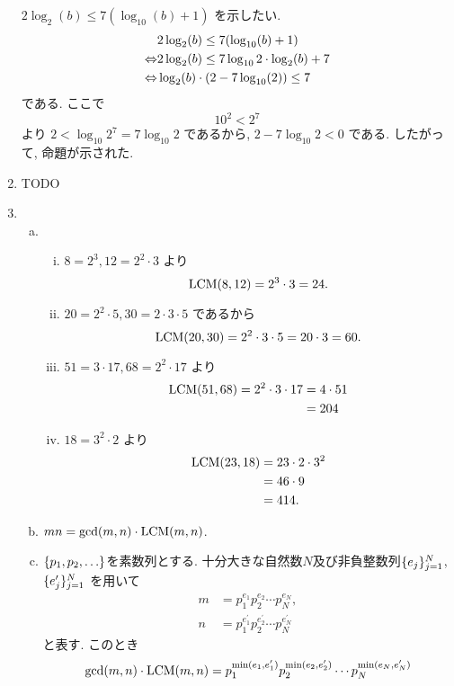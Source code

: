\begin{enumerate}[5.1]
$2 \log_2(b) \le 7(\log_{10}(b) + 1)$ を示したい.
\begin{align*}
  & 2\log_{2}(b) \le 7(\log_{10}(b) + 1) \\
  \Leftrightarrow & 2\log_2(b) \le 7\log_{10}2 \cdot \log_2(b) + 7 \\
  \Leftrightarrow & \log_2(b) \cdot (2 - 7\log_{10}(2)) \le 7
\end{align*}
である.
ここで
\[
  10^2 < 2^7
\]
より $2 < \log_{10}2^7 = 7\log_{10} 2$ であるから, $2 - 7\log_{10} 2 < 0$ である.
したがって, 命題が示された.
\item TODO
\item
\begin{enumerate}[(a)] %
\item
\begin{enumerate}[(i)] %
\item $8 = 2^3, 12 = 2^2 \cdot 3$ より
  \[
    \LCM(8, 12) = 2^3 \cdot 3 = 24.
  \]
\item $20 = 2^2 \cdot 5, 30 = 2 \cdot 3 \cdot 5$ であるから
  \[
    \LCM(20, 30) = 2^2 \cdot 3 \cdot 5 = 20 \cdot 3 = 60.
  \]
\item $51 = 3 \cdot 17, 68 = 2^2 \cdot 17$ より
  \begin{align*}
    \LCM(51, 68)
      = 2^2 \cdot 3 \cdot 17 &= 4 \cdot 51 \\
                             &= 204
  \end{align*}
\item $18 = 3^2 \cdot 2$ より
  \begin{align*}
    \LCM(23, 18)
      &= 23 \cdot 2 \cdot 3^2 \\
      &= 46 \cdot 9 \\
      &= 414.
  \end{align*}
\end{enumerate} %
\item %
$mn = \gcd(m, n) \cdot \LCM(m, n)$.
\item %
$\{ p_1, p_2, \ldots \}$を素数列とする.
十分大きな自然数$N$及び非負整数列$\{ e_j \}_{j=1}^N$, $\{ e_j^\prime \}_{j=1}^N$
を用いて
\begin{align*}
  m &= p_1^{e_1} p_2^{e_2} \cdots p_N^{e_N}, \\
  n &= p_1^{e_1^\prime} p_2^{e_2^\prime} \cdots p_N^{e_N^{\prime}}
\end{align*}
と表す.
このとき
\begin{align*}
  \gcd(m, n) \cdot \LCM(m, n)
    &= p_1^{\min(e_1, e_1^\prime)} p_2^{\min(e_2, e_2^\prime)} \cdots p_N^{\min(e_N, e_N^\prime)} \\

\end{align*}
\end{enumerate}
\end{enumerate}
